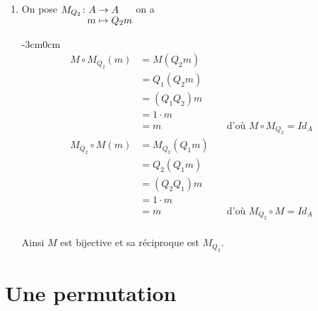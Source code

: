 \documentclass[a4paper, 12pt]{article}
\begin{document}
\begin{enumerate}[label=\textbf{Question \arabic*.}, leftmargin=*]
\begin{lstlisting}[language=Python]
    Q1 = (x_bar + 1)*y_bar^3 + y_bar^2 + y_bar + x_bar
    Q2 = (x_bar^3 + x_bar + 1)*y_bar^3 + (x_bar^3 + x_bar^2 + 1)*y_bar^2 + (x_bar^3 + 1)*y_bar +(x^3 + x^2 + x)

    print(Q1 * Q2)
    # Affiche 1
\end{lstlisting}
Ainsi $Q_1 Q_2 = 1$ dans $\mathbb{F}_{2^8}[y]/(y^4 + 1)$.

    \item\label{q:26} On pose 
$\funcdef{M_{Q_2}}{A}{A}{m}{Q_2 m}$
on a

\begin{adjustwidth}{-3cm}{0cm}
\[
\begin{aligned}
    M \circ M_{Q_2}(m) &= M(Q_2 m) \\
    &= Q_1 (Q_2 m) \\
    &= (Q_1 Q_2) m \\
    &= 1 \cdot m \\
    &= m
    &\quad \text{d'où } M \circ M_{Q_2} = Id_A \\[2em]
    M_{Q_2} \circ M(m) &= M_{Q_2}(Q_1 m) \\
    &= Q_2 (Q_1 m) \\
    &= (Q_2 Q_1) m \\
    &= 1 \cdot m \\
    &= m
    &\quad \text{d'où } M_{Q_2} \circ M = Id_A \\[2em]
\end{aligned}
\]
\end{adjustwidth}

Ainsi $M$ est bijective et sa réciproque est $M_{Q_2}$.

\end{enumerate}
\section{Une permutation}
\end{document}

